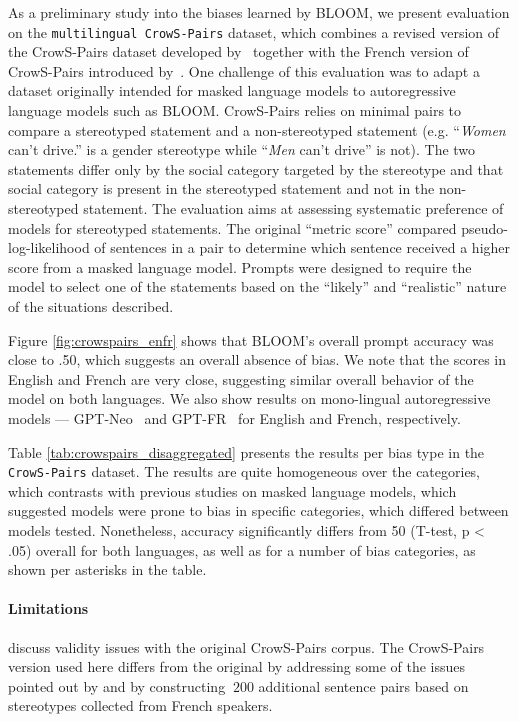 As a preliminary study into the biases learned by BLOOM, we present evaluation on the \texttt{multilingual CrowS-Pairs} dataset, which combines a revised version of the CrowS-Pairs dataset developed by~\cite{nangia-etal-2020-crows} together with the French version of CrowS-Pairs introduced by~\cite{neveol-etal-2022-french}. One challenge of this evaluation was to adapt a dataset originally intended for masked language models to autoregressive language models such as BLOOM. CrowS-Pairs relies on minimal pairs to compare a stereotyped statement and a non-stereotyped statement (e.g. ``\textit{Women} can't drive.'' is a gender stereotype while ``\textit{Men} can't drive'' is not). The two statements differ only by the social category targeted by the stereotype and that social category is present in the stereotyped statement and not in the non-stereotyped statement. The evaluation aims at assessing systematic preference of models for stereotyped statements. The original ``metric score'' compared pseudo-log-likelihood of sentences in a pair to determine which sentence received a higher score from a masked language model. Prompts were designed to require the model to select one of the statements based on the ``likely'' and ``realistic'' nature of the situations described.

Figure \ref{fig:crowspairs_enfr} shows that BLOOM's overall prompt accuracy was close to .50, which suggests an overall absence of bias. We note that the scores in English and French are very close, suggesting similar overall behavior of the model on both languages. We also show results on mono-lingual autoregressive models --- GPT-Neo~\citep{black2021gpt} and GPT-FR~\citep{simoulin:hal-03265900} for English and French, respectively.

Table \ref{tab:crowspairs_disaggregated} presents the results per bias type in the \texttt{CrowS-Pairs} dataset. The results are quite homogeneous over the categories, which contrasts with previous studies on masked language models, which suggested models were prone to bias in specific categories, which differed between models tested. Nonetheless, accuracy significantly differs from 50 (T-test, p < .05) overall for both languages, as well as for a number of bias categories, as shown per asterisks in the table.  

\paragraph{Limitations}

\cite{blodgett-etal-2021-stereotyping} discuss validity issues with the original CrowS-Pairs corpus. The CrowS-Pairs version used here differs from the original by addressing some of the issues pointed out by \citet{blodgett-etal-2021-stereotyping} and by constructing $~200$ additional sentence pairs based on stereotypes collected from French speakers.

